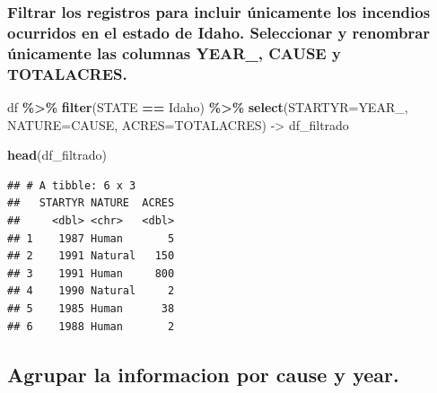 \documentclass[
]{book}
\newenvironment{Shaded}{\begin{snugshade}}{\end{snugshade}}
\newcommand{\AttributeTok}[1]{\textcolor[rgb]{0.13,0.29,0.53}{#1}}
\newcommand{\FunctionTok}[1]{\textcolor[rgb]{0.13,0.29,0.53}{\textbf{#1}}}
\newcommand{\NormalTok}[1]{#1}
\newcommand{\OtherTok}[1]{\textcolor[rgb]{0.56,0.35,0.01}{#1}}
\newcommand{\SpecialCharTok}[1]{\textcolor[rgb]{0.81,0.36,0.00}{\textbf{#1}}}
\newcommand{\StringTok}[1]{\textcolor[rgb]{0.31,0.60,0.02}{#1}}
\begin{document}
\subsubsection*{Filtrar los registros para incluir únicamente los incendios ocurridos en el estado de Idaho. Seleccionar y renombrar únicamente las columnas YEAR\_, CAUSE y TOTALACRES.}\label{filtrar-los-registros-para-incluir-uxfanicamente-los-incendios-ocurridos-en-el-estado-de-idaho.-seleccionar-y-renombrar-uxfanicamente-las-columnas-year_-cause-y-totalacres.}

\begin{Shaded}
\begin{Highlighting}[]
\NormalTok{df }\SpecialCharTok{\%\textgreater{}\%} 
  \FunctionTok{filter}\NormalTok{(STATE }\SpecialCharTok{==} \StringTok{\textquotesingle{}Idaho\textquotesingle{}}\NormalTok{)  }\SpecialCharTok{\%\textgreater{}\%} 
  \FunctionTok{select}\NormalTok{(}\AttributeTok{STARTYR=}\NormalTok{YEAR\_, }\AttributeTok{NATURE=}\NormalTok{CAUSE, }\AttributeTok{ACRES=}\NormalTok{TOTALACRES) }\OtherTok{{-}\textgreater{}}\NormalTok{ df\_filtrado}

\FunctionTok{head}\NormalTok{(df\_filtrado)}
\end{Highlighting}
\end{Shaded}

\begin{verbatim}
## # A tibble: 6 x 3
##   STARTYR NATURE  ACRES
##     <dbl> <chr>   <dbl>
## 1    1987 Human       5
## 2    1991 Natural   150
## 3    1991 Human     800
## 4    1990 Natural     2
## 5    1985 Human      38
## 6    1988 Human       2
\end{verbatim}

\subsection*{Agrupar la informacion por cause y year.}\label{agrupar-la-informacion-por-cause-y-year.}
\end{document}
